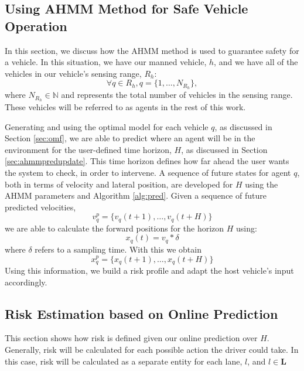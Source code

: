 \documentclass[letterpaper, 10 pt, conference]{ieeeconf}  %
\begin{document}
\subsection{Using AHMM Method for Safe Vehicle Operation}
In this section, we discuss how the AHMM method is used to guarantee safety for a vehicle. In this situation, we have our manned vehicle, $h$, and we have all of the vehicles in our vehicle's sensing range, $R_h$:
\begin{equation}
    \forall{q}\in R_h, q = \{1,\ldots,N_{R_h}\},
\end{equation}
where $N_{R_h}\in\mathbb{N}$ and represents the total number of vehicles in the sensing range. These vehicles will be referred to as agents in the rest of this work.

Generating and using the optimal model for each vehicle $q$, as discussed in Section \ref{sec:omf}, we are able to predict where an agent will be in the environment for the user-defined time horizon, $H$, as discussed in Section \ref{sec:ahmmpredupdate}. This time horizon defines how far ahead the user wants the system to check, in order to intervene. A sequence of future states for agent $q$, both in terms of velocity and lateral position, are developed for $H$ using the AHMM parameters and Algorithm \ref{alg:pred}. Given a sequence of future predicted velocities,
\begin{equation}
    v_q^p = \{v_q(t+1),\ldots,v_q(t+H)\}
\end{equation}
we are able to calculate the forward positions for the horizon $H$ using:
\begin{equation} \label{eq:dumpos}
    x_q(t) = v_q*\delta
\end{equation}
where $\delta$ refers to a sampling time. With this we obtain
\begin{equation}
    x_q^p = \{x_q(t+1),\ldots,x_q(t+H)\}
\end{equation}
Using this information, we build a risk profile and adapt the host vehicle's input accordingly.


\subsection{Risk Estimation based on Online Prediction}
This section shows how risk is defined given our online prediction over $H$. Generally, risk will be calculated for each possible action the driver could take. In this case, risk will be calculated as a separate entity for each lane, $l$, and $l\in\mathbf{L}$
\end{document}

